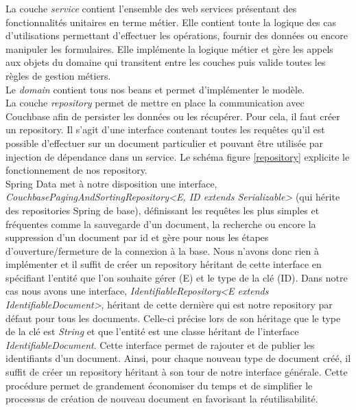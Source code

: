 	La couche \textit{service} contient l'ensemble des web services présentant des fonctionnalités unitaires en terme métier. Elle contient toute la logique des cas d'utilisations permettant d'effectuer les opérations, fournir des données ou encore manipuler les formulaires. Elle implémente la logique métier et gère les appels aux objets du domaine qui transitent entre les couches puis valide toutes les règles de gestion métiers. \\
	
	Le \textit{domain} contient tous nos beans et permet d'implémenter le modèle. \\
	
	La couche \textit{repository} permet de mettre en place la communication avec Couchbase afin de persister les données ou les récupérer. Pour cela, il faut créer un repository. Il s'agit d'une interface contenant toutes les requêtes qu'il est possible d'effectuer sur un document particulier et pouvant être utilisée par injection de dépendance dans un service. Le schéma figure \ref{repository} explicite le fonctionnement de nos repository. \\
	
	Spring Data met à notre disposition une interface, \textit{CouchbasePagingAndSortingRepository<E, ID extends Serializable>} (qui hérite des repositories Spring de base), définissant les requêtes les plus simples et fréquentes comme la sauvegarde d'un document, la recherche ou encore la suppression d'un document par id et gère pour nous les étapes d'ouverture/fermeture de la connexion à la base. Nous n'avons donc rien à implémenter et il suffit de créer un repository héritant de cette interface en spécifiant l'entité que l'on souhaite gérer (E) et le type de la clé (ID). Dans notre cas nous avons une interface, \textit{IdentifiableRepository<E extends IdentifiableDocument>}, héritant de cette dernière qui est notre repository par défaut pour tous les documents. Celle-ci précise lors de son héritage que le type de la clé est \textit{String } et que l'entité est une classe héritant de l'interface \textit{IdentifiableDocument}. Cette interface permet de rajouter et de publier les identifiants d'un document. Ainsi, pour chaque nouveau type de document créé, il suffit de créer un repository héritant à son tour de notre interface générale. Cette procédure permet de grandement économiser du temps et de simplifier le processus de création de nouveau document en favorisant la réutilisabilité.

